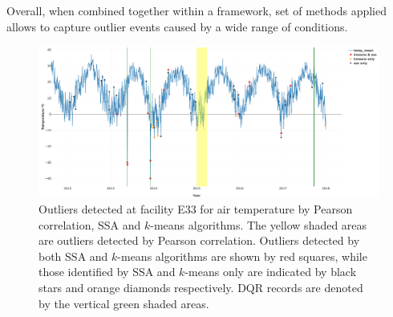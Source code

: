 Overall, when combined together within a framework, set of methods applied allows
to capture outlier events caused by a wide range of conditions. 

\begin{figure}[ht]
    \centering
    \includegraphics[width=\textwidth]{figures/combined.png}
    \caption{Outliers detected at facility E33 for air temperature
		by Pearson correlation, SSA and $k$-means algorithms. The yellow shaded areas are
		outliers detected by Pearson correlation. Outliers detected by both SSA and $k$-means
		algorithms are shown by red squares, while those identified by
		SSA and $k$-means only are indicated by black stars and orange
		diamonds respectively. DQR records are denoted by the vertical green shaded areas.}
    \label{fig:combined}
\end{figure}
